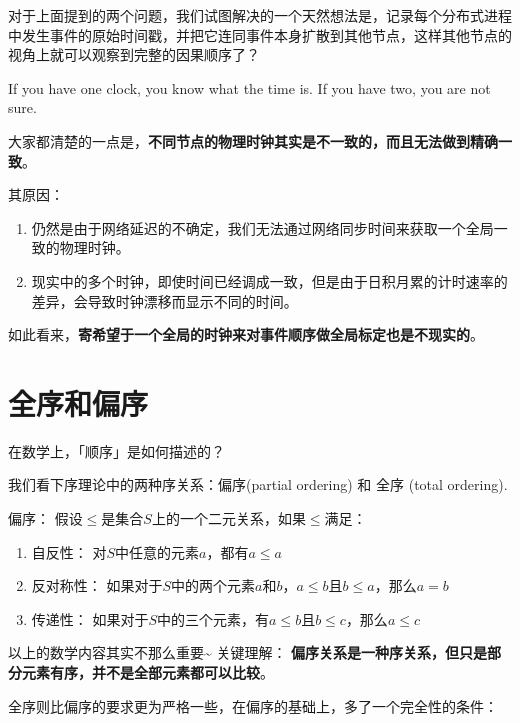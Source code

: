 \documentclass[cn,11pt,chinese]{elegantbook}
\providecommand{\tightlist}{%
  \setlength{\itemsep}{0pt}\setlength{\parskip}{0pt}}
\renewenvironment{quote}{\begin{customblockquote}\list{}{\rightmargin=0em\leftmargin=0em}%
\item\relax\color{blockquote-text}\ignorespaces}{\unskip\unskip\endlist\end{customblockquote}}
\begin{document}
对于上面提到的两个问题，我们试图解决的一个天然想法是，记录每个分布式进程中发生事件的原始时间戳，并把它连同事件本身扩散到其他节点，这样其他节点的视角上就可以观察到完整的因果顺序了？

\begin{quote}
If you have one clock, you know what the time is. If you have two, you
are not sure.
\end{quote}

大家都清楚的一点是，\textbf{不同节点的物理时钟其实是不一致的，而且无法做到精确一致}。

其原因：

\begin{enumerate}
\def\labelenumi{\arabic{enumi}.}
\tightlist
\item
  仍然是由于网络延迟的不确定，我们无法通过网络同步时间来获取一个全局一致的物理时钟。
\item
  现实中的多个时钟，即使时间已经调成一致，但是由于日积月累的计时速率的差异，会导致时钟漂移而显示不同的时间。
\end{enumerate}

如此看来，\textbf{寄希望于一个全局的时钟来对事件顺序做全局标定也是不现实的}。

\hypertarget{ux5168ux5e8fux548cux504fux5e8f}{%
\section{全序和偏序}\label{ux5168ux5e8fux548cux504fux5e8f}}

在数学上，「顺序」是如何描述的？

我们看下序理论中的两种序关系：偏序(partial ordering) 和 全序 (total
ordering).

偏序： 假设\(\leq\)是集合\(S\)上的一个二元关系，如果\(\leq\)满足：

\begin{enumerate}
\def\labelenumi{\arabic{enumi}.}
\tightlist
\item
  自反性： 对\(S\)中任意的元素\(a\)，都有\(a \leq a\)
\item
  反对称性：
  如果对于\(S\)中的两个元素\(a\)和\(b\)，\(a \leq b\)且\(b \leq a\)，那么\(a = b\)
\item
  传递性：
  如果对于\(S\)中的三个元素，有\(a \leq b\)且\(b \leq c\)，那么\(a \leq c\)
\end{enumerate}

以上的数学内容其实不那么重要\textasciitilde{} 关键理解：
\textbf{偏序关系是一种序关系，但只是部分元素有序，并不是全部元素都可以比较}。

全序则比偏序的要求更为严格一些，在偏序的基础上，多了一个完全性的条件：
\end{document}

